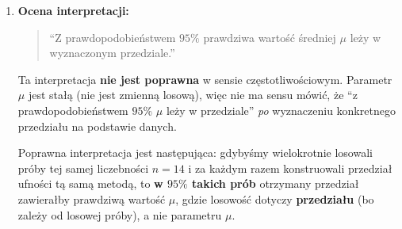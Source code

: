 \documentclass[polish, 10pt]{extarticle}
\begin{document}
\begin{enumerate}
\begin{itemize}
Ponieważ rozkład $t_{n-1}$ jest symetryczny względem zera, kwantyle spełniają zależność
\[
t_{0.025,\;n-1}=-t_{0.975,\;n-1}.
\]
W konsekwencji równoważnie możemy zapisać
\[
\mathbb{P}\!\left(-t_{0.975,\;n-1}\le T\le t_{0.975,\;n-1}\right)=0{,}95.
\]

\smallskip
\textbf{Krok 2: podstawienie definicji $T$ i rozwiązanie nierówności względem $\mu$.}
Z kroku 2 mamy:
\[
\mathbb{P}\!\left(
-t_{0.975,\;n-1}
\le
\frac{\bar{X}-\mu}{S/\sqrt{n}}
\le
t_{0.975,\;n-1}
\right)=0{,}95.
\]
Mnożymy nierówność przez dodatnią liczbę $S/\sqrt{n}$ (nie zmienia znaku nierówności):
\[
\mathbb{P}\!\left(
-t_{0.975,\;n-1}\frac{S}{\sqrt{n}}
\le
\bar{X}-\mu
\le
t_{0.975,\;n-1}\frac{S}{\sqrt{n}}
\right)=0{,}95.
\]
Teraz przekształcamy tak, aby w środku był parametr $\mu$. 
\[
\mathbb{P}\!\left(
\bar{X}- t_{0.975,\;n-1}\frac{S}{\sqrt{n}}
\le
\mu
\le
\bar{X}+ t_{0.975,\;n-1}\frac{S}{\sqrt{n}}
\right)=0{,}95.
\]
Z definicji oznacza to, że
\[
\boxed{
CI_{0.95}(\mu)=
\left(
\bar{X}- t_{0.975,\;n-1}\frac{S}{\sqrt{n}},
\;
\bar{X}+ t_{0.975,\;n-1}\frac{S}{\sqrt{n}}
\right)
}
\]
jest $95\%$ przedziałem ufności dla $\mu$.

\end{itemize}


\item \textbf{Ocena interpretacji:}
\begin{quote}
``Z prawdopodobieństwem $95\%$ prawdziwa wartość średniej $\mu$ leży w wyznaczonym przedziale.''
\end{quote}

Ta interpretacja \textbf{nie jest poprawna} w sensie częstotliwościowym. Parametr $\mu$ jest stałą (nie jest zmienną losową), więc nie ma sensu mówić, że ``z prawdopodobieństwem $95\%$ $\mu$ leży w przedziale'' \emph{po} wyznaczeniu konkretnego przedziału na podstawie danych.

Poprawna interpretacja jest następująca:
gdybyśmy wielokrotnie losowali próby tej samej liczebności $n=14$ i za każdym razem konstruowali przedział ufności tą samą metodą, to \textbf{w $95\%$ takich prób} otrzymany przedział zawierałby prawdziwą wartość $\mu$, gdzie losowość dotyczy \textbf{przedziału} (bo zależy od losowej próby), a nie parametru $\mu$.

\end{enumerate}
\end{document}
